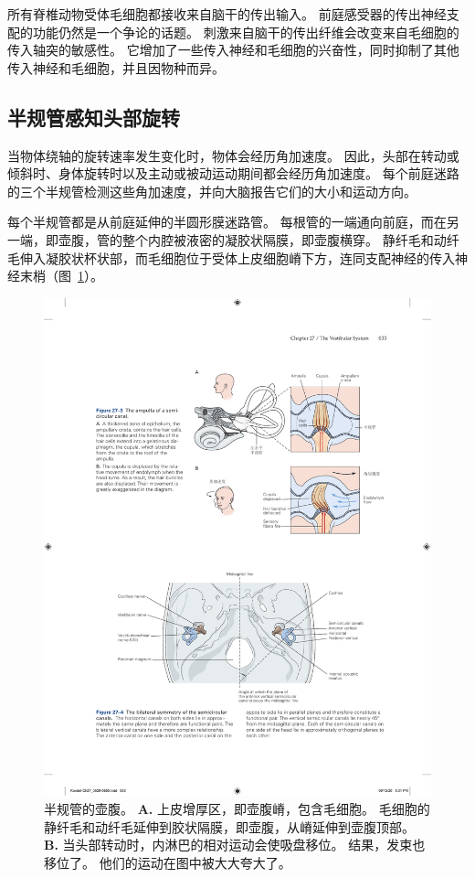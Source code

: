所有脊椎动物受体毛细胞都接收来自脑干的传出输入。
前庭感受器的传出神经支配的功能仍然是一个争论的话题。
刺激来自脑干的传出纤维会改变来自毛细胞的传入轴突的敏感性。
它增加了一些传入神经和毛细胞的兴奋性，同时抑制了其他传入神经和毛细胞，并且因物种而异。



\subsection{半规管感知头部旋转}

当物体绕轴的旋转速率发生变化时，物体会经历角加速度。
因此，头部在转动或倾斜时、身体旋转时以及主动或被动运动期间都会经历角加速度。
每个前庭迷路的三个半规管检测这些角加速度，并向大脑报告它们的大小和运动方向。


每个半规管都是从前庭延伸的半圆形膜迷路管。
每根管的一端通向前庭，而在另一端，即壶腹，管的整个内腔被液密的凝胶状隔膜，即壶腹横穿。
静纤毛和动纤毛伸入凝胶状杯状部，而毛细胞位于受体上皮细胞嵴下方，连同支配神经的传入神经末梢（图~\ref{fig:27_3}）。


\begin{figure}[htbp]
	\centering
	\includegraphics[width=0.7\linewidth]{chap27/fig_27_3}
	\caption{半规管的壶腹。
		\textbf{A.} 上皮增厚区，即壶腹嵴，包含毛细胞。
		毛细胞的静纤毛和动纤毛延伸到胶状隔膜，即壶腹，从嵴延伸到壶腹顶部。
		\textbf{B.} 当头部转动时，内淋巴的相对运动会使吸盘移位。
		结果，发束也移位了。
		他们的运动在图中被大大夸大了。}
	\label{fig:27_3}
\end{figure}


